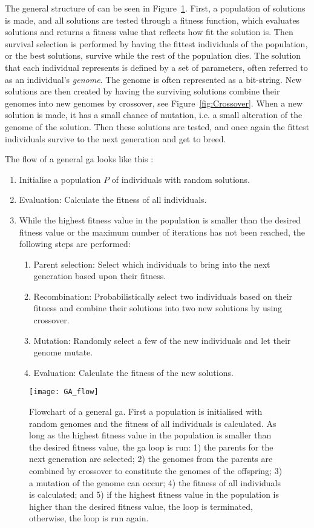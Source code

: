 The general structure of  can be seen in Figure~\ref{fig:GA}. First, a population of solutions is made, and all solutions are tested through a fitness function, which evaluates solutions and returns a fitness value that reflects how fit the solution is. Then survival selection is performed by having the fittest individuals of the population, or the best solutions, survive while the rest of the population dies. The solution that each individual represents is defined by a set of parameters, often referred to as an individual’s \textit{genome}. The genome is often represented as a bit-string. New solutions are then created by having the surviving solutions combine their genomes into new genomes by crossover, see Figure~\ref{fig:Crossover}. When a new solution is made, it has a small chance of mutation, i.e. a small alteration of the genome of the solution. Then these solutions are tested, and once again the fittest individuals survive to the next generation and get to breed.

The flow of a general \ac{ga} looks like this \citep{michalski2013machine}:
\begin{enumerate}
    \item Initialise a population $P$ of individuals with random solutions.
    \item Evaluation: Calculate the fitness of all individuals.
    \item While the highest fitness value in the population is smaller than the desired fitness value or the maximum number of iterations has not been reached, the following steps are performed:
    \begin{enumerate}
        \item Parent selection: Select which individuals to bring into the next generation based upon their fitness.
        \item Recombination: Probabilistically select two individuals based on their fitness and combine their solutions into two new solutions by using crossover.
        \item Mutation: Randomly select a few of the new individuals and let their genome mutate.
        \item Evaluation: Calculate the fitness of the new solutions.
    \end{enumerate}
\end{enumerate}


\begin{figure}[htbp]
    \centering
    \texttt{[image: GA\_flow]}
    \caption[Flowchart of a general \ac{ga}.]{Flowchart of a general \ac{ga}. First a population is initialised with random genomes and the fitness of all individuals is calculated. As long as the highest fitness value in the population is smaller than the desired fitness value, the \ac{ga} loop is run: 1) the parents for the next generation are selected; 2) the genomes from the parents are combined by crossover to constitute the genomes of the offspring; 3) a mutation of the genome can occur; 4) the fitness of all individuals is calculated; and 5) if the highest fitness value in the population is higher than the desired fitness value, the loop is terminated, otherwise, the loop is run again.}
    \label{fig:GA}
\end{figure}

